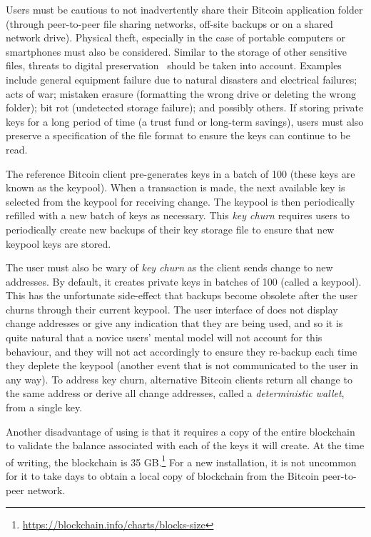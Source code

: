Users must be cautious to not inadvertently share their Bitcoin application folder (\eg through peer-to-peer file sharing networks, off-site backups or on a shared network drive). Physical theft, especially in the case of portable computers or smartphones must also be considered. Similar to the storage of other sensitive files, threats to digital preservation~\cite{BKM05} should be taken into account. Examples include general equipment failure due to natural disasters and electrical failures; acts of war; mistaken erasure (\eg formatting the wrong drive or deleting the wrong folder); bit rot (\ie undetected storage failure); and possibly others. If storing private keys for a long period of time (\eg a trust fund or long-term savings), users must also preserve a specification of the file format to ensure the keys can continue to be read.

The reference Bitcoin client pre-generates keys in a batch of 100 (these keys are known as the keypool). When a transaction is made, the next available key is selected from the keypool for receiving change. The keypool is then periodically refilled with a new batch of keys as necessary. This \emph{key churn} requires users to periodically create new backups of their key storage file to ensure that new keypool keys are stored. 

The user must also be wary of \textit{key churn} as the \Bitcoinclient client sends change to new addresses. By default, it creates private keys in batches of 100 (called a keypool). This has the unfortunate side-effect that backups become obsolete after the user churns through their current keypool. The user interface of \Bitcoinclient does not display change addresses or give any indication that they are being used, and so it is quite natural that a novice users' mental model will not account for this behaviour, and they will not act accordingly to ensure they re-backup \walletfile each time they deplete the keypool (another event that is not communicated to the user in any way). To address key churn, alternative Bitcoin clients return all change to the same address or derive all change addresses, called a \textit{deterministic wallet}, from a single key.

Another disadvantage of using \Bitcoinclient is that it requires a copy of the entire blockchain to validate the balance associated with each of the keys it will create. At the time of writing, the blockchain is 35 GB.\footnote{\url{https://blockchain.info/charts/blocks-size}} For a new installation, it is not uncommon for it to take days to obtain a local copy of blockchain from the Bitcoin peer-to-peer network.

